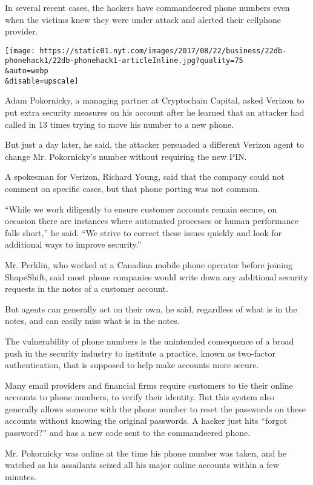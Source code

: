 In several recent cases, the hackers have commandeered phone numbers
even when the victims knew they were under attack and alerted their
cellphone provider.

\texttt{[image: https://static01.nyt.com/images/2017/08/22/business/22db-phonehack1/22db-phonehack1-articleInline.jpg?quality=75\\\&auto=webp\\\&disable=upscale]}

Adam Pokornicky, a managing partner at Cryptochain Capital, asked
Verizon to put extra security measures on his account after he learned
that an attacker had called in 13 times trying to move his number to a
new phone.

But just a day later, he said, the attacker persuaded a different
Verizon agent to change Mr. Pokornicky's number without requiring the
new PIN.

A spokesman for Verizon, Richard Young, said that the company could not
comment on specific cases, but that phone porting was not common.

``While we work diligently to ensure customer accounts remain secure, on
occasion there are instances where automated processes or human
performance falls short,'' he said. ``We strive to correct these issues
quickly and look for additional ways to improve security.''

Mr. Perklin, who worked at a Canadian mobile phone operator before
joining ShapeShift, said most phone companies would write down any
additional security requests in the notes of a customer account.

But agents can generally act on their own, he said, regardless of what
is in the notes, and can easily miss what is in the notes.

The vulnerability of phone numbers is the unintended consequence of a
broad push in the security industry to institute a practice, known as
two-factor authentication, that is supposed to help make accounts more
secure.

Many email providers and financial firms require customers to tie their
online accounts to phone numbers, to verify their identity. But this
system also generally allows someone with the phone number to reset the
passwords on these accounts without knowing the original passwords. A
hacker just hits ``forgot password?'' and has a new code sent to the
commandeered phone.

Mr. Pokornicky was online at the time his phone number was taken, and he
watched as his assailants seized all his major online accounts within a
few minutes.

